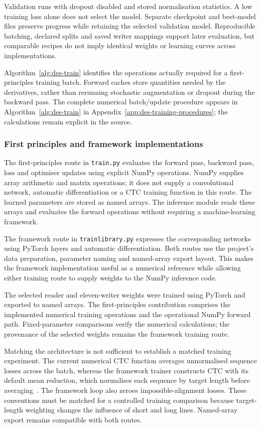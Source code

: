 Validation runs with dropout disabled and stored normalisation statistics. A low training loss alone does not select the model. Separate checkpoint and best-model files preserve progress while retaining the selected validation model. Reproducible batching, declared splits and saved writer mappings support later evaluation, but comparable recipes do not imply identical weights or learning curves across implementations.

Algorithm~\ref{alg:des-train} identifies the operations actually required for a first-principles training batch. Forward caches store quantities needed by the derivatives, rather than rerunning stochastic augmentation or dropout during the backward pass.
The complete numerical batch/update procedure appears in Algorithm~\ref{alg:des-train} in Appendix~\ref{app:des-training-procedures}; the calculations remain explicit in the source.

\subsubsection{First principles and framework implementations}
\label{sec:des-implementations}
The first-principles route in \texttt{train.py} evaluates the forward pass, backward pass, loss and optimiser updates using explicit NumPy operations. NumPy supplies array arithmetic and matrix operations; it does not supply a convolutional network, automatic differentiation or a CTC training function in this route. The learned parameters are stored as named arrays. The inference module reads these arrays and evaluates the forward operations without requiring a machine-learning framework.

The framework route in \texttt{trainlibrary.py} expresses the corresponding networks using PyTorch layers and automatic differentiation. Both routes use the project's data preparation, parameter naming and named-array export layout. This makes the framework implementation useful as a numerical reference while allowing either training route to supply weights to the NumPy inference code.

The selected reader and eleven-writer weights were trained using PyTorch and exported to named arrays. The first-principles contribution comprises the implemented numerical training operations and the operational NumPy forward path. Fixed-parameter comparisons verify the numerical calculations; the provenance of the selected weights remains the framework training route.

Matching the architecture is not sufficient to establish a matched training experiment. The current numerical CTC function averages unnormalised sequence losses across the batch, whereas the framework trainer constructs CTC with its default mean reduction, which normalises each sequence by target length before averaging~\cite{pytorchctc}. The framework loop also zeroes impossible-alignment losses. These conventions must be matched for a controlled training comparison because target-length weighting changes the influence of short and long lines. Named-array export remains compatible with both routes.


